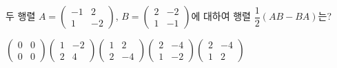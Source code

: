\hspace*{2mm}\begin{minipage}[t]{\dimexpr\linewidth-2mm\relax}\vspace{0pt}
두 행렬 $A=\begin{pmatrix} -1 & 2 \\ 1 & -2 \end{pmatrix}$, $B=\begin{pmatrix} 2 & -2 \\ 1 & -1 \end{pmatrix}$에 대하여 행렬 $\dfrac{1}{2}(AB-BA)$는?
\begin{choicesii}{$\begin{pmatrix} 0 & 0 \\ 0 & 0 \end{pmatrix}$}{$\begin{pmatrix} 1 & -2 \\ 2 & 4 \end{pmatrix}$}{$\begin{pmatrix} 1 & 2 \\ 2 & -4 \end{pmatrix}$}{$\begin{pmatrix} 2 & -4 \\ 1 & -2 \end{pmatrix}$}{$\begin{pmatrix} 2 & -4 \\ 1 & 2 \end{pmatrix}$}\end{choicesii}\end{minipage}
